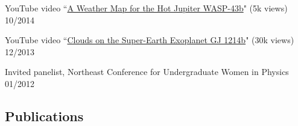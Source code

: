 \documentclass[12pt,letterpaper]{article}
\begin{document}
\begin{compactitem}[]
\item YouTube video ``\href{https://www.youtube.com/watch?v=tQZqAVhUk9E}{A Weather Map for the Hot Jupiter WASP-43b}" (5k views) \hfill 10/2014
\item YouTube video ``\href{https://www.youtube.com/watch?v=8x2DcgZiKTA}{Clouds on the Super-Earth Exoplanet GJ 1214b}" (30k views) \hfill 12/2013
\item Invited panelist, Northeast Conference for Undergraduate Women in Physics \hfill 01/2012
\end{compactitem}

\newpage
\subsection*{Publications}                              
\end{document}
